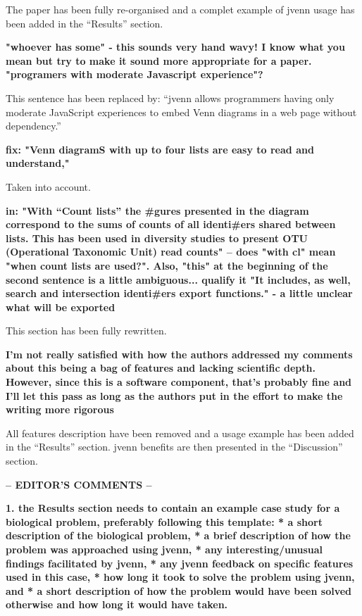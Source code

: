 \documentclass[10pt,stdletter,dateno,sigleft]{newlfm} %
\begin{document}
\begin{newlfm}
The paper has been fully re-organised and a complet example of jvenn usage has
been added in the ``Results'' section.


\textbf{"whoever has some" - this sounds very hand wavy! I know what you mean
but try to make it sound more appropriate for a paper. "programers with moderate
Javascript experience"?}

This sentence has been replaced by: ``jvenn allows programmers having only
moderate JavaScript experiences to embed Venn diagrams in a web page without
dependency.''


\textbf{fix: "Venn diagramS with up to four lists are easy to read and
understand,"}

Taken into account.


\textbf{in: "With “Count lists” the #gures presented in the diagram
correspond to the sums of counts of all identi#ers shared between lists. This has
been used in diversity studies to present OTU (Operational Taxonomic Unit) read
counts" -- does "with cl" mean "when count lists are used?". Also, "this" at the
beginning of the second sentence is a little ambiguous... qualify it
"It includes, as well, search and intersection identi#ers export functions." - a little
unclear what will be exported}

This section has been fully rewritten.


\textbf{I'm not really satisfied with how the authors addressed my comments
about this being a bag of features and lacking scientific depth. However, since
this is a software component, that's probably fine and I'll let this pass as long
as the authors put in the effort to make the writing more rigorous}

All features description have been removed and a usage example has been added in
the ``Results'' section. jvenn benefits are then presented in the ``Discussion''
section.


\textbf{-- EDITOR'S COMMENTS --}

\textbf{1. the Results section needs to contain an example case study for a
biological problem, preferably following this template:\newline
* a short description of the biological problem, \newline
* a brief description of how the problem was approached using jvenn, \newline
* any interesting/unusual findings facilitated by jvenn, \newline
* any jvenn feedback on specific features used in this case, \newline
* how long it took to solve the problem using jvenn, and \newline
* a short description of how the problem would have been solved otherwise and
how long it would have taken.\newline}


\end{newlfm}
\end{document}
